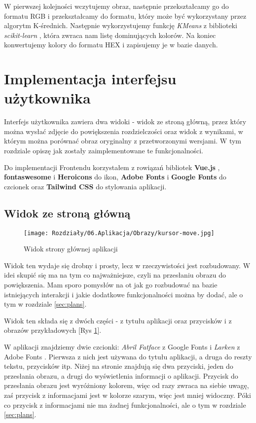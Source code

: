 W pierwszej kolejności wczytujemy obraz, następnie przekształcamy go do formatu RGB i przekształcamy do formatu, który może być wykorzystany przez algorytm K-średnich. Następnie wykorzystujemy funkcję \textit{KMeans} z biblioteki \textit{scikit-learn} \cite{sklearn}, która zwraca nam listę dominujących kolorów. Na koniec konwertujemy kolory do formatu HEX i zapisujemy je w bazie danych.



\section{Implementacja interfejsu użytkownika}

Interfejs użytkownika zawiera dwa widoki - widok ze stroną główną, przez który można wysłać zdjęcie do powiększenia rozdzielczości oraz widok z wynikami, w którym można porównać obraz oryginalny z przetworzonymi wersjami. W tym rozdziale opiszę jak zostały zaimplementowane te funkcjonalności.

Do implementacji Frontendu korzystałem z rowiązań bibliotek \textbf{Vue.js} \cite{vusjs}, \textbf{fontaswesome} \cite{fontaswesome} i \textbf{Heroicons} \cite{heroicons} do ikon, \textbf{Adobe Fonts} \cite{adobefonts} i \textbf{Google Fonts} \cite{googlefonts} do czcionek oraz \textbf{Tailwind CSS} \cite{tailwindcss} do stylowania aplikacji.

\subsection*{Widok ze stroną główną}

\begin{figure}[H]
    \centering
    \texttt{[image: Rozdziały/06.Aplikacja/Obrazy/kursor-move.jpg]}  
    \caption{Widok strony głównej aplikacji}
    \label{fig:image88}
\end{figure}

Widok ten wydaje się drobny i prosty, lecz w rzeczywistości jest rozbudowany. W idei skupić się ma na tym co najważniejsze, czyli na przesłaniu obrazu do powiększenia. Mam sporo pomysłów na ot jak go rozbudować na bazie istniejących interakcji i jakie dodatkowe funkcjonalności można by dodać, ale o tym w rozdziale \ref{sec:plans}.

Widok ten składa się z dwóch części - z tytułu aplikacji oraz przycisków i z obrazów przykładowych [Rys \ref{fig:image88}]. 

W aplikacji znajdziemy dwie czcionki: \textit{Abril Fatface} z Google Fonts \cite{googlefonts} i \textit{Larken} z Adobe Fonts \cite{adobefonts}. Pierwsza z nich jest używana do tytułu aplikacji, a druga do reszty tekstu, przycisków itp.
Niżej na stronie znajdują się dwa przyciski, jeden do przesłania obrazu, a drugi do wyświetlenia informacji o aplikacji. Przycisk do przesłania obrazu jest wyróżniony kolorem, więc od razy zwraca na siebie uwagę, zaś przycisk z informacjami jest w kolorze szarym, więc jest mniej widoczny. Póki co przycisk z informacjami nie ma żadnej funkcjonalności, ale o tym w rozdziale \ref{sec:plans}. 

